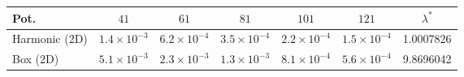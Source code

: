 \footnotesize
\setlength{\tabcolsep}{2.5pt}
\begin{tabular}{lcccccc}
\toprule
Pot.\ & $41$ & $61$ & $81$ & $101$ & $121$ & $\lambda^\ast$ \\
\midrule
Harmonic (2D) & $1.4\times10^{-3}$ & $6.2\times10^{-4}$ & $3.5\times10^{-4}$ & $2.2\times10^{-4}$ & $1.5\times10^{-4}$ & 1.0007826 \\
Box (2D) & $5.1\times10^{-3}$ & $2.3\times10^{-3}$ & $1.3\times10^{-3}$ & $8.1\times10^{-4}$ & $5.6\times10^{-4}$ & 9.8696042 \\
\bottomrule
\end{tabular}
